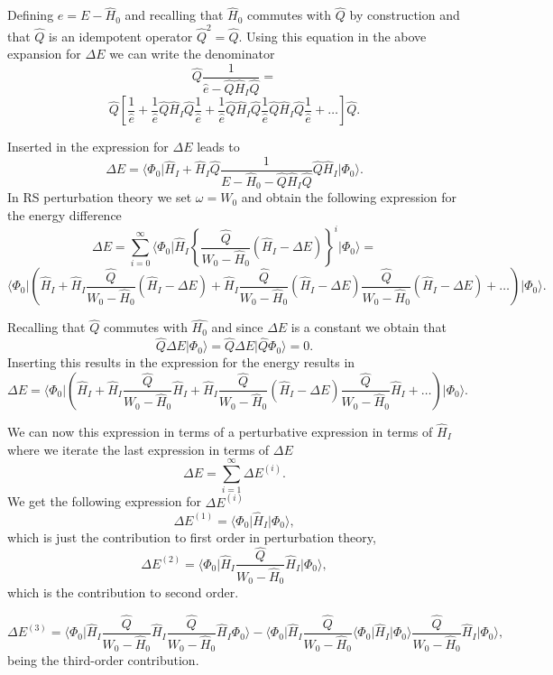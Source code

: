 Defining $e=E-\hat{H}_0$ and recalling that $\hat{H}_0$ commutes with 
$\hat{Q}$ by construction and that $\hat{Q}$ is an idempotent operator
$\hat{Q}^2=\hat{Q}$. 
Using this equation in the above expansion for $\Delta E$ we can write the denominator 
\[
\hat{Q}\frac{1}{\hat{e}-\hat{Q}\hat{H}_I\hat{Q}}=
\]
\[
\hat{Q}\left[\frac{1}{\hat{e}}+\frac{1}{\hat{e}}\hat{Q}\hat{H}_I\hat{Q}
\frac{1}{\hat{e}}+\frac{1}{\hat{e}}\hat{Q}\hat{H}_I\hat{Q}
\frac{1}{\hat{e}}\hat{Q}\hat{H}_I\hat{Q}\frac{1}{\hat{e}}+\dots\right]\hat{Q}.
\]

Inserted in the expression for $\Delta E$ leads to 
\[
\Delta E=
\langle \Phi_0\vert \hat{H}_I+\hat{H}_I\hat{Q}\frac{1}{E-\hat{H}_0-\hat{Q}\hat{H}_I\hat{Q}}\hat{Q}\hat{H}_I\vert \Phi_0\rangle. 
\]
In RS perturbation theory we set $\omega = W_0$ and obtain the following expression for the energy difference
\[
\Delta E=\sum_{i=0}^{\infty}\langle \Phi_0\vert \hat{H}_I\left\{\frac{\hat{Q}}{W_0-\hat{H}_0}\left(\hat{H}_I-\Delta E\right)\right\}^i\vert \Phi_0\rangle=
\]
\[
\langle \Phi_0\vert \left(\hat{H}_I+\hat{H}_I\frac{\hat{Q}}{W_0-\hat{H}_0}(\hat{H}_I-\Delta E)+
\hat{H}_I\frac{\hat{Q}}{W_0-\hat{H}_0}(\hat{H}_I-\Delta E)\frac{\hat{Q}}{W_0-\hat{H}_0}(\hat{H}_I-\Delta E)+\dots\right)\vert \Phi_0\rangle.
\]



Recalling that $\hat{Q}$ commutes with $\hat{H_0}$ and since $\Delta E$ is a constant we obtain that
\[
\hat{Q}\Delta E\vert \Phi_0\rangle = \hat{Q}\Delta E\vert \hat{Q}\Phi_0\rangle = 0.
\]
Inserting this results in the expression for the energy results in
\[
\Delta E=\langle \Phi_0\vert \left(\hat{H}_I+\hat{H}_I\frac{\hat{Q}}{W_0-\hat{H}_0}\hat{H}_I+
\hat{H}_I\frac{\hat{Q}}{W_0-\hat{H}_0}(\hat{H}_I-\Delta E)\frac{\hat{Q}}{W_0-\hat{H}_0}\hat{H}_I+\dots\right)\vert \Phi_0\rangle.
\]



We can now this expression in terms of a perturbative expression in terms
of $\hat{H}_I$ where we iterate the last expression in terms of $\Delta E$
\[
\Delta E=\sum_{i=1}^{\infty}\Delta E^{(i)}.
\]
We get the following expression for $\Delta E^{(i)}$
\[
\Delta E^{(1)}=\langle \Phi_0\vert \hat{H}_I\vert \Phi_0\rangle,
\] 
which is just the contribution to first order in perturbation theory,
\[
\Delta E^{(2)}=\langle\Phi_0\vert \hat{H}_I\frac{\hat{Q}}{W_0-\hat{H}_0}\hat{H}_I\vert \Phi_0\rangle, 
\]
which is the contribution to second order.



\[
\Delta E^{(3)}=\langle \Phi_0\vert \hat{H}_I\frac{\hat{Q}}{W_0-\hat{H}_0}\hat{H}_I\frac{\hat{Q}}{W_0-\hat{H}_0}\hat{H}_I\Phi_0\rangle-
\langle\Phi_0\vert \hat{H}_I\frac{\hat{Q}}{W_0-\hat{H}_0}\langle \Phi_0\vert \hat{H}_I\vert \Phi_0\rangle\frac{\hat{Q}}{W_0-\hat{H}_0}\hat{H}_I\vert \Phi_0\rangle,
\]
being the third-order contribution. 


